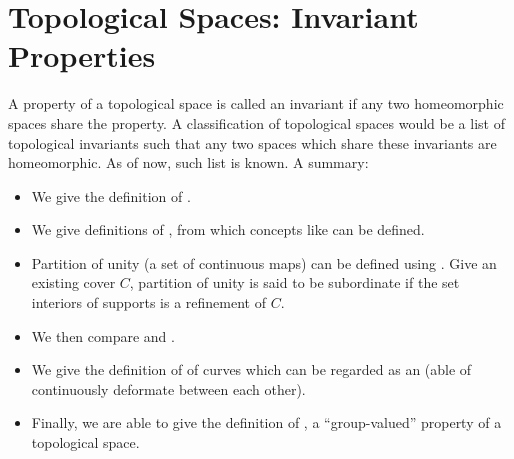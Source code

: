 \documentclass{article}
\begin{document}
\section{Topological Spaces: Invariant  Properties}
A property of a topological space is called an invariant if any two homeomorphic spaces share the property. A classification of topological spaces would be a list of topological invariants such that any two spaces which share these invariants are homeomorphic. As of now,  such list is known. 
A summary:
\begin{itemize}[$\blacktriangleright$]
\item We give the definition of .
\item We give definitions of , from which concepts like  can be defined.
\item Partition of unity (a set of continuous maps) can be defined using  . Give an existing cover $C$, partition of unity is said to be subordinate if the set interiors of supports is a refinement of $C$.
\item We then compare  and .
\item We give the definition of  of curves which can be regarded as an  (able of continuously deformate between each other).
\item Finally, we are able to give the definition of ,  a ``group-valued'' property of a topological space.
\end{itemize}
\end{document}
